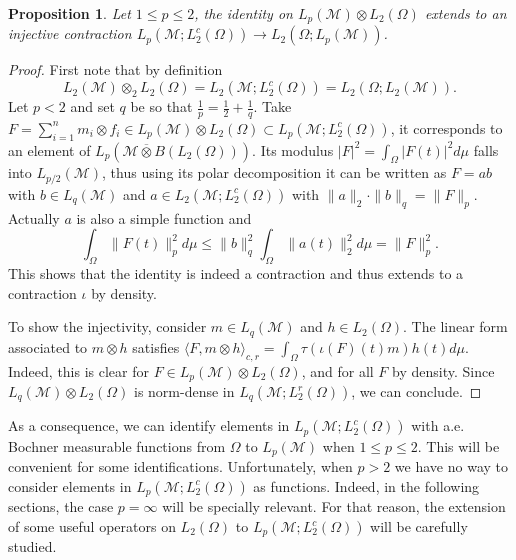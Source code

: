 \documentclass[psamsfonts]{amsart}
\newtheorem{proposition}[theorem]{Proposition}
\newcommand{\la}{\langle}
\newcommand{\ra}{\rangle}
\newcommand{\Lp}{L_p}
\newcommand{\Ltwo}{L_2}
\newcommand{\Lq}{L_q}
\newcommand{\Ltwoc}{L_2^c}
\begin{document}
    \begin{proposition}\label{functions}Let $1\leq p \leq 2$, the identity on $\Lp(\mathcal M)\otimes L_2(\Omega)$
      extends to an injective contraction $\Lp(\mathcal{M};L_2^c(\Omega))\to
      \Ltwo(\Omega;\Lp(\mathcal{M}))$.
      \end{proposition}
      \begin{proof}
        First note that by definition
        $$\Ltwo(\mathcal M)\otimes_2 L_2(\Omega)=\Ltwo(\mathcal{M};L_2^c(\Omega))=\Ltwo(\Omega;\Ltwo(\mathcal{M})).$$
        Let $p<2$ and set $q$ be so that
        $\frac 1 p=\frac 1 2 +\frac 1 q$.  Take
        $F=\sum_{i=1}^n m_i\otimes f_i \in \Lp(\mathcal M)\otimes
        L_2(\Omega)\subset \Lp(\mathcal{M};L_2^c(\Omega))$, it
        corresponds to an element of
        $\Lp(\mathcal M \overline\otimes B(\Ltwo(\Omega)))$. Its
        modulus $|F|^2= \int_\Omega |F(t)|^2d\mu$ falls into $L_{p/2}(\mathcal M)$, thus
        using its polar decomposition it can be written as $F=ab$ with
        $b\in \Lq(\mathcal M)$ and
        $a\in \Ltwo(\mathcal{M};L_2^c(\Omega))$ with
        $\|a\|_2 \cdot \|b\|_q=\|F\|_p$. Actually $a$ is also a simple function  and
$$\int_\Omega \|F(t)\|_p^2 d\mu \leq \|b\|_q^2 \int_\Omega \|a(t)\|_2^2 d\mu=\|F\|_p^2.$$
This shows that the identity is indeed a contraction and thus extends to a contraction $\iota$ by density.

To show the injectivity, consider $m\in \Lq(\mathcal M)$ and
$h\in L_2(\Omega)$.  The linear form associated to
$m\otimes  h$ satisfies
$\la F, m\otimes  h\ra_{c,r}=\int_\Omega \tau(\iota(F)(t)m)
 h(t) d\mu$. Indeed, this is clear for
$F\in \Lp(\mathcal M)\otimes L_2(\Omega)$, and for all $F$ by density.
Since $\Lq(\mathcal M)\otimes L_2(\Omega)$ is norm-dense in $\Lq(\mathcal M;  L_2^r(\Omega))$, we can conclude. 
           \end{proof}


As a consequence, we can identify elements in $\Lp(\mathcal M;  \Ltwoc(\Omega))$ with a.e. Bochner measurable functions from $\Omega$ to $\Lp(\mathcal M)$ when $1\leq p\leq 2$. This will be convenient for some identifications. Unfortunately, when $p>2$ we have no way to consider elements in $\Lp(\mathcal{M};\Ltwoc(\Omega))$ as  functions. Indeed, in the following sections, the case $p=\infty$ will be specially relevant. For that reason, the  extension of some useful operators on $\Ltwo(\Omega)$ to $\Lp(\mathcal{M};\Ltwoc(\Omega))$ will be carefully studied.
    
\end{document}
